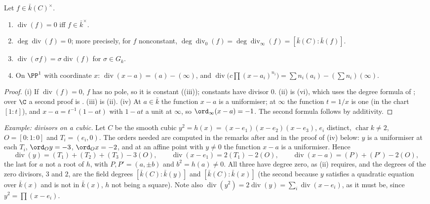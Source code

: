 \begin{proposition}\label{prop:curves:principal}
Let $f\in\bar k(C)^\times$.
\begin{enumerate}[label=(\roman*)]
\item $\operatorname{div}(f)=0$ iff $f\in\bar k^\times$.
\item $\deg\operatorname{div}(f)=0$; more precisely, for $f$ nonconstant, $\deg\operatorname{div}_0(f)=\deg\operatorname{div}_\infty(f)=[\bar k(C):\bar k(f)]$.
\item $\operatorname{div}(\sigma f)=\sigma\operatorname{div}(f)$ for $\sigma\in G_k$.
\item On $\PP^1$ with coordinate $x$: $\operatorname{div}(x-a)=(a)-(\infty)$, and $\operatorname{div}\bigl(c\prod(x-a_i)^{n_i}\bigr)=\sum n_i(a_i)-(\sum n_i)(\infty)$.
\end{enumerate}
\end{proposition}

\begin{proof}
(i) If $\operatorname{div}(f)=0$, $f$ has no pole, so it is constant ((iii)); constants have divisor $0$. (ii) is
(vi), which uses the degree formula of ; over $\C$ a second proof is
. (iii) is (ii). (iv) At $a\in\bar k$ the function $x-a$ is a uniformiser; at $\infty$ the
function $t=1/x$ is one (in the chart $[1:t]$), and $x-a=t^{-1}(1-at)$ with $1-at$ a unit at $\infty$, so $\ord_\infty(x-a)=-1$. The second formula follows
by additivity.
\end{proof}

\emph{Example: divisors on a cubic.}
Let $C$ be the smooth cubic $y^2=h(x)=(x-e_1)(x-e_2)(x-e_3)$, $e_i$ distinct, $\operatorname{char}k\ne2$, $O=[0:1:0]$ and $T_i=(e_i,0)$. The orders
needed are computed in the remarks after  and in the proof of (iv) below: $y$ is a uniformiser at
each $T_i$, $\ord_O y=-3$, $\ord_O x=-2$, and at an affine point with $y\ne0$ the function $x-a$ is a uniformiser. Hence
\[
\operatorname{div}(y)=(T_1)+(T_2)+(T_3)-3(O),\qquad \operatorname{div}(x-e_1)=2(T_1)-2(O),\qquad \operatorname{div}(x-a)=(P)+(P')-2(O),
\]
the last for $a$ not a root of $h$, with $P,P'=(a,\pm b)$ and $b^2=h(a)\ne0$. All three have degree zero, as (ii) requires, and
the degrees of the zero divisors, $3$ and $2$, are the field degrees $[\bar k(C):\bar k(y)]$ and $[\bar k(C):\bar k(x)]$ (the second because $y$ satisfies a
quadratic equation over $\bar k(x)$ and is not in $\bar k(x)$, $h$ not being a square). Note also $\operatorname{div}(y^2)=2\operatorname{div}(y)=\sum_i\operatorname{div}(x-e_i)$,
as it must be, since $y^2=\prod(x-e_i)$.

